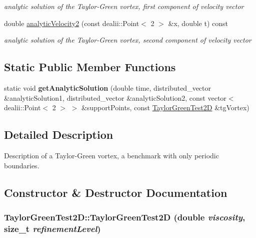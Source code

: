 \begin{DoxyCompactItemize}
\begin{DoxyCompactList}\small\item\em analytic solution of the Taylor-\/Green vortex, first component of velocity vector \item\end{DoxyCompactList}\item 
\hypertarget{classTaylorGreenTest2D_af7c07357ef5c57c46218b9c65e45572d}{
double \hyperlink{classTaylorGreenTest2D_af7c07357ef5c57c46218b9c65e45572d}{analyticVelocity2} (const dealii::Point$<$ 2 $>$ \&x, double t) const }
\label{classTaylorGreenTest2D_af7c07357ef5c57c46218b9c65e45572d}

\begin{DoxyCompactList}\small\item\em analytic solution of the Taylor-\/Green vortex, second component of velocity vector \item\end{DoxyCompactList}\end{DoxyCompactItemize}
\subsection*{Static Public Member Functions}
\begin{DoxyCompactItemize}
\item 
\hypertarget{classTaylorGreenTest2D_a648c0969136540979c37f81d3ab1f1b2}{
static void {\bfseries getAnalyticSolution} (double time, distributed\_\-vector \&analyticSolution1, distributed\_\-vector \&analyticSolution2, const vector$<$ dealii::Point$<$ 2 $>$ $>$ \&supportPoints, const \hyperlink{classTaylorGreenTest2D}{TaylorGreenTest2D} \&tgVortex)}
\label{classTaylorGreenTest2D_a648c0969136540979c37f81d3ab1f1b2}

\end{DoxyCompactItemize}


\subsection{Detailed Description}
Description of a Taylor-\/Green vortex, a benchmark with only periodic boundaries. 

\subsection{Constructor \& Destructor Documentation}
\hypertarget{classTaylorGreenTest2D_a891500a30b0fae0784496f9c219bd31b}{
\subsubsection[{TaylorGreenTest2D}]{\setlength{\rightskip}{0pt plus 5cm}TaylorGreenTest2D::TaylorGreenTest2D (double {\em viscosity}, \/  size\_\-t {\em refinementLevel})}}
\label{classTaylorGreenTest2D_a891500a30b0fae0784496f9c219bd31b}


